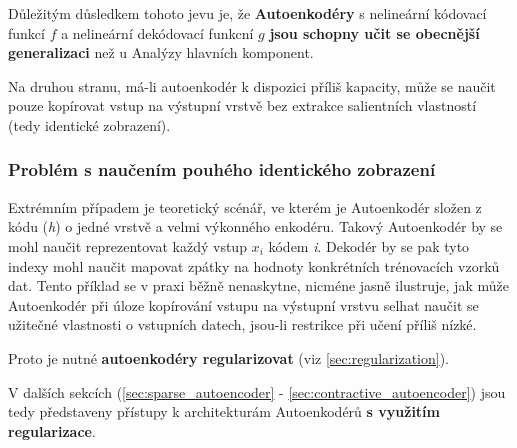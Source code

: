 Důležitým důsledkem tohoto jevu je, že \textbf{Autoenkodéry} s nelineární kódovací funkcí $f$
a nelineární dekódovací funkcní $g$ \textbf{jsou schopny učit se obecnější generalizaci}
než u Analýzy hlavních komponent. \cite{Goodfellow2016}

Na druhou stranu, má-li autoenkodér k dispozici příliš kapacity,
může se naučit pouze kopírovat vstup na výstupní vrstvě bez extrakce salientních vlastností (tedy identické zobrazení).

\subsubsection{Problém s naučením pouhého identického zobrazení}
\label{sec:identity}
Extrémním případem je teoretický scénář, ve kterém je Autoenkodér složen z kódu (\emph{h}) o jedné vrstvě a velmi výkonného enkodéru.
Takový Autoenkodér by se mohl naučit reprezentovat každý vstup $x_i$ kódem \emph{i}.
Dekodér by se pak tyto indexy mohl naučit mapovat zpátky na hodnoty konkrétních trénovacích vzorků dat.
Tento příklad se v praxi běžně nenaskytne, nicméne jasně ilustruje,
jak může Autoenkodér při úloze kopírování vstupu na výstupní vrstvu selhat naučit se užitečné vlastnosti o vstupních datech, jsou-li restrikce při učení příliš nízké. \cite{Goodfellow2016}

Proto je nutné \textbf{autoenkodéry regularizovat} (viz \autoref{sec:regularization}).

V dalších sekcích (\autoref{sec:sparse_autoencoder} - \autoref{sec:contractive_autoencoder}) jsou tedy představeny přístupy k architekturám Autoenkodérů \textbf{s využitím regularizace}.